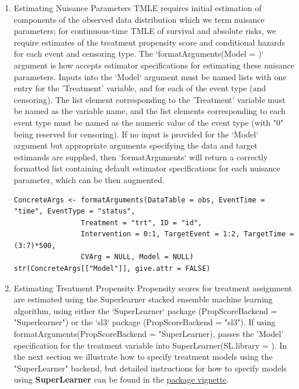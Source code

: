 \documentclass{report}
\newcommand{\1}{\ensuremath{\mathbf{1}}}
\begin{document}
\begin{enumerate}
\item Estimating Nuisance Parameters
\label{NuisanceEstimation}
TMLE requires initial estimation of components of the observed data distribution which we term nuisance parameters; for continuous-time TMLE of survival and absolute risks, we require estimates of the treatment propensity score and conditional hazards for each event and censoring type. The `formatArguments(Model = )` argument is how  accepts estimator specifications for estimating these nuisance parameters. Inputs into the `Model` argument must be named lists with one entry for the 'Treatment' variable, and for each of the event type (and censoring). The list element corresponding to the 'Treatment' variable must be named as the variable name, and the list elements corresponding to each event type must be named as the numeric value of the event type (with "0" being reserved for censoring). If no input is provided for the `Model` argument but appropriate arguments specifying the data and target estimands are supplied, then `formatArguments` will return a correctly formatted list containing default estimator specifications for each nuisance parameter, which can be then augmented.

\begin{lstlisting}
ConcreteArgs <- formatArguments(DataTable = obs, EventTime = "time", EventType = "status", 
				Treatment = "trt", ID = "id", 
				Intervention = 0:1, TargetEvent = 1:2, TargetTime = (3:7)*500, 
				CVArg = NULL, Model = NULL)
str(ConcreteArgs[["Model"]], give.attr = FALSE)
\end{lstlisting}

\item Estimating Treatment Propensity
\label{PropScore}
Propensity scores for treatment assignment are estimated using the Superlearner stacked ensemble machine learning algorithm, using either the `SuperLearner` package (PropScoreBackend = "Superlearner") or the `sl3` package (PropScoreBackend = "sl3").  If using formatArguments(PropScoreBackend = "SuperLearner),   passes the 'Model' specification for the treatment variable into SuperLearner(SL.library = ). In the next section we illustrate how to specify treatment models using the "SuperLearner" backend, but detailed instructions for how to specify models using \textbf{SuperLearner} can be found in the \href{https://cran.r-project.org/web/packages/SuperLearner/vignettes/Guide-to-SuperLearner.html}{package vignette}.


\end{enumerate}
\end{document}
